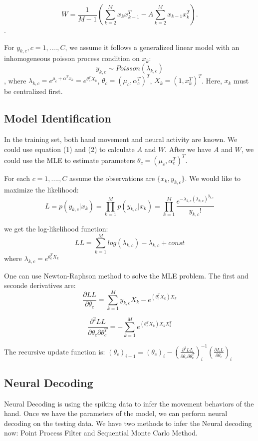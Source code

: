 \documentclass[12pt,letterpaper]{article}
\begin{document}
\begin{equation}
W = \frac{1}{M-1}(\sum_{k=2}^{M}x_k x_{k-1}^T-A \sum_{k=2}^{M}x_{k-1}x_k^T) .
\end{equation}.

For $y_{k,c},c=1,....,C$, we assume it follows a generalized linear model with an inhomogeneous poisson process condition on $x_k$: 
$$y_{k,c} \sim Poisson(\lambda_{k,c})$$, where $\lambda_{k,c} = e^{\mu_{c} + \alpha^T x_k} = e^{\theta_c^T X_k}$, $\theta_c = (\mu_c, \alpha_c^T)^T$, $X_k = (1,x_k^T)^T$. Here, $x_k$ must be centralized first. 
 
\subsection{Model Identification}

In the training set, both hand movement and neural activity are known. We could use equation (1) and (2) to calculate $A$ and $W$. After we have $A$ and $W$, we could use the MLE to estimate parameters $\theta_c = (\mu_c, \alpha_c^T)^T$. 

For each $c = 1,....,C$ assume the observations are $\{ x_k,y_{k,c}\}$. We would like to maximize the likelihood: 
\begin{equation}
L = p(y_{k,c}|x_k) = \prod_{k=1}^M p(y_{k,c}|x_k) = \prod_{k=1}^M \frac{e^{-\lambda_{k,c}(\lambda_{k,c})^{y_{k,c}}}}{y_{k,c}!}
\end{equation}

we get the log-likelihood function:
$$LL = \sum_{k=1}^{M} log(\lambda_{k,c}) - \lambda_{k,c} + const
$$
where $\lambda_{k,c} = e^{\theta_c^T X_k}$

One can use Newton-Raphson method to solve the MLE problem. The first and seconde derivatives are:
$$\frac{\partial LL}{\partial \theta_c} = \sum_{k=1}^{M} y_{k,c} X_k - e^{(\theta_c^T X_k)X_k}$$

$$\frac{\partial ^2 LL}{\partial \theta_c \partial \theta_c^T} = -\sum_{k=1}^{M} e^{(\theta_c^T X_k)X_k X_k^T}$$

The recursive update function is: $(\theta_c)_{i+1} = (\theta_c)_i - (\frac{\partial^2 LL}{\partial \theta_c \partial \theta_c^T})^{-1}_i (\frac{\partial LL}{\partial \theta_c})_i$

\subsection{Neural Decoding}

Neural Decoding is using the spiking data to infer the movement behaviors of the hand. 
Once we have the parameters of the model, we can perform neural decoding on the testing data.  We have two methods to infer the Neural decoding now: Point Process Filter and Sequential Monte Carlo Method.
\end{document}

